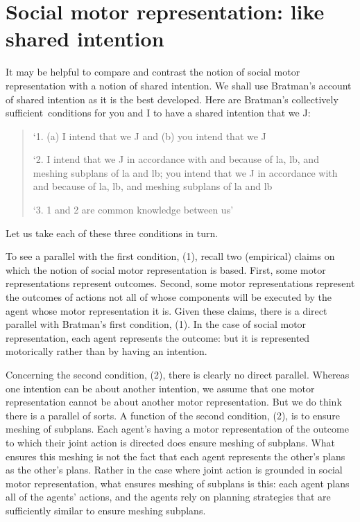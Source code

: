 \documentclass[12pt,\papersize]{extarticle}
\begin{document}
\section{Social motor representation: like shared intention}
It may be helpful to compare and contrast the notion of social motor representation with a notion of shared intention. 
We shall use Bratman's account of shared intention as it is the best developed. 
Here are Bratman’s collectively sufficient\footnotemark \ conditions for you and I to have a shared intention that we J:
%
%
\begin{quote}
\label{quote:bratman_account}
`1. (a) I intend that we J and (b) you intend that we J
 
`2. I intend that we J in accordance with and because of la, lb, and meshing subplans of la and lb; you intend that we J in accordance with and because of la, lb, and meshing subplans of la and lb
 
`3. 1 and 2 are common knowledge between us' \citep[][p.\ View 4]{Bratman:1993je}
\end{quote}
%
Let us take each of these three conditions in turn.

To see a parallel with the first condition, (1), recall two (empirical) claims on which the notion of social motor representation is based.
First, some motor representations represent outcomes.
Second, some motor representations represent the outcomes of actions not all of whose components will be executed by the agent whose motor representation it is.
Given these claims, there is a direct parallel with Bratman's first condition, (1).
In the case of social motor representation, each agent represents the outcome: but it is represented motorically rather than by having an intention.


Concerning the second condition, (2), there is clearly no {direct} parallel. 
Whereas one intention can be about another intention, 
we assume that one motor representation cannot be about another motor representation.
But we do think there is a parallel of sorts. 
A function of the second condition, (2), is to ensure meshing of subplans. 
Each agent's having a motor representation of the outcome to which their joint action is directed does ensure meshing of subplans.
What ensures this meshing is not the fact that each agent represents the other's plans {as the other's plans}.
Rather in the case where joint action is grounded in social motor representation, what ensures meshing of subplans is this:
each agent plans all of the agents' actions, and the agents rely on planning strategies that are sufficiently similar to ensure meshing subplans.
\end{document}
